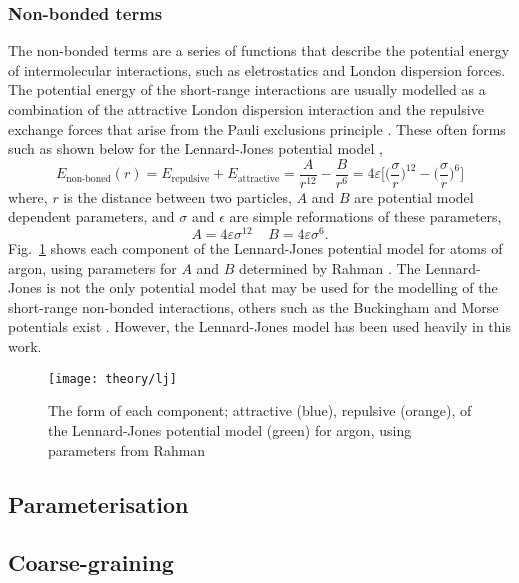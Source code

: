 \subsubsection{Non-bonded terms}
The non-bonded terms are a series of functions that describe the potential energy of intermolecular interactions, such as eletrostatics and London dispersion forces.
The potential energy of the short-range interactions are usually modelled as a combination of the attractive London dispersion interaction and the repulsive exchange forces that arise from the Pauli exclusions principle \cite{Leach1996}.
These often forms such as shown below for the Lennard-Jones potential model \cite{LennardJones1924},
%
\begin{equation}
  E_{\text{non-boned}}(r) = E_{\text{repulsive}} + E_{\text{attractive}} = \frac{A}{r^{12}} - \frac{B}{r^6} = 4\varepsilon\Bigg[\bigg(\frac{\sigma}{r}\bigg)^{12} - \bigg(\frac{\sigma}{r}\bigg)^6\Bigg]
\end{equation}
%
where, $r$ is the distance between two particles, $A$ and $B$ are potential model dependent parameters, and $\sigma$ and $\epsilon$ are simple reformations of these parameters,
%
\begin{equation}
  A = 4\varepsilon\sigma^{12} \;\;\;\; B = 4\varepsilon\sigma^6.
\end{equation}
%
Fig.~\ref{fig:lj} shows each component of the Lennard-Jones potential model for atoms of argon, using parameters for $A$ and $B$ determined by Rahman \cite{Rahman1964}.
The Lennard-Jones is not the only potential model that may be used for the modelling of the short-range non-bonded interactions, others such as the Buckingham and Morse potentials exist \cite{Buckingham1938, Morse1929}.
However, the Lennard-Jones model has been used heavily in this work.
%
\begin{figure}
	\centering
	\texttt{[image: theory/lj]}
	\caption{The form of each component; attractive (blue), repulsive (orange), of the Lennard-Jones potential model (green) for argon, using parameters from Rahman \cite{Rahman1964}}
	\label{fig:lj}
\end{figure}
%




\subsection{Parameterisation}
\label{sec:parameterisation}
\subsection{Coarse-graining}
